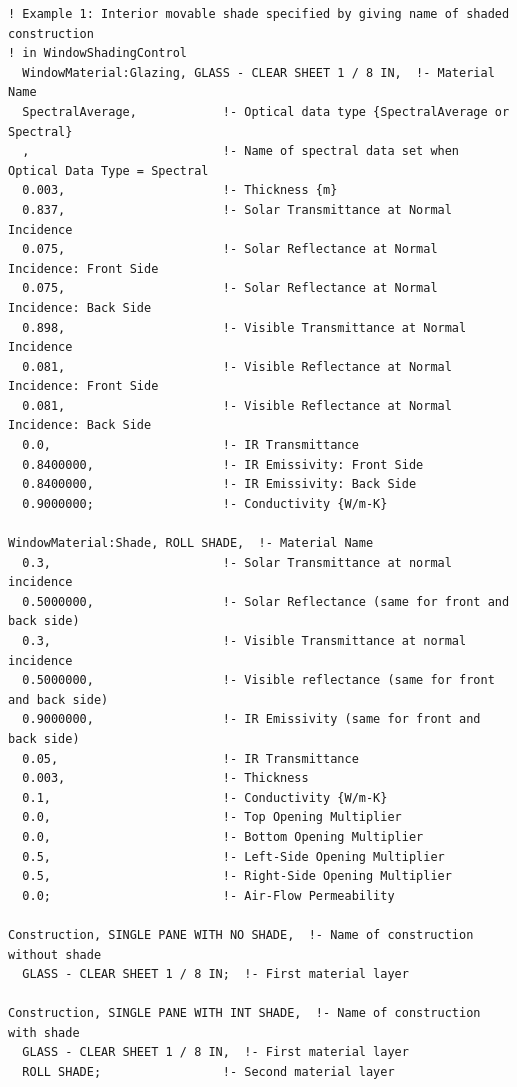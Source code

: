 \begin{lstlisting}
! Example 1: Interior movable shade specified by giving name of shaded construction
! in WindowShadingControl
  WindowMaterial:Glazing, GLASS - CLEAR SHEET 1 / 8 IN,  !- Material Name
  SpectralAverage,            !- Optical data type {SpectralAverage or Spectral}
  ,                           !- Name of spectral data set when Optical Data Type = Spectral
  0.003,                      !- Thickness {m}
  0.837,                      !- Solar Transmittance at Normal Incidence
  0.075,                      !- Solar Reflectance at Normal Incidence: Front Side
  0.075,                      !- Solar Reflectance at Normal Incidence: Back Side
  0.898,                      !- Visible Transmittance at Normal Incidence
  0.081,                      !- Visible Reflectance at Normal Incidence: Front Side
  0.081,                      !- Visible Reflectance at Normal Incidence: Back Side
  0.0,                        !- IR Transmittance
  0.8400000,                  !- IR Emissivity: Front Side
  0.8400000,                  !- IR Emissivity: Back Side
  0.9000000;                  !- Conductivity {W/m-K}

WindowMaterial:Shade, ROLL SHADE,  !- Material Name
  0.3,                        !- Solar Transmittance at normal incidence
  0.5000000,                  !- Solar Reflectance (same for front and back side)
  0.3,                        !- Visible Transmittance at normal incidence
  0.5000000,                  !- Visible reflectance (same for front and back side)
  0.9000000,                  !- IR Emissivity (same for front and back side)
  0.05,                       !- IR Transmittance
  0.003,                      !- Thickness
  0.1,                        !- Conductivity {W/m-K}
  0.0,                        !- Top Opening Multiplier
  0.0,                        !- Bottom Opening Multiplier
  0.5,                        !- Left-Side Opening Multiplier
  0.5,                        !- Right-Side Opening Multiplier
  0.0;                        !- Air-Flow Permeability

Construction, SINGLE PANE WITH NO SHADE,  !- Name of construction without shade
  GLASS - CLEAR SHEET 1 / 8 IN;  !- First material layer

Construction, SINGLE PANE WITH INT SHADE,  !- Name of construction with shade
  GLASS - CLEAR SHEET 1 / 8 IN,  !- First material layer
  ROLL SHADE;                 !- Second material layer


\end{lstlisting}
